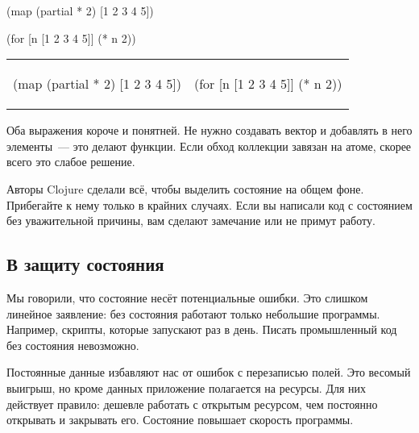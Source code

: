 \begin{clojure}
(map (partial * 2)
     [1 2 3 4 5])
\end{clojure}

\splitter

\begin{clojure}
(for [n [1 2 3 4 5]]
  (* n 2))
\end{clojure}

\else

\noindent
\begin{tabular}{ @{}p{5cm} @{}p{5cm} }

\begin{clojure}
(map (partial * 2)
     [1 2 3 4 5])
\end{clojure}

&

\begin{clojure}
(for [n [1 2 3 4 5]]
  (* n 2))
\end{clojure}

\end{tabular}

\fi

Оба выражения короче и понятней. Не нужно создавать вектор и добавлять в него
элементы~--- это делают функции. Если обход коллекции завязан на
атоме, скорее всего это слабое решение.

Авторы Clojure сделали всё, чтобы выделить состояние на общем фоне. Прибегайте к
нему только в крайних случаях. Если вы написали код с состоянием без
уважительной причины, вам сделают замечание или не примут работу.


\subsection{В защиту состояния}

Мы говорили, что состояние несёт потенциальные ошибки. Это слишком линейное
заявление: без состояния работают только небольшие программы. Например, скрипты,
которые запускают раз в день. Писать промышленный код без состояния невозможно.


Постоянные данные избавляют нас от ошибок с перезаписью полей. Это весомый
выигрыш, но кроме данных приложение полагается на ресурсы. Для них действует
правило: дешевле работать с открытым ресурсом, чем постоянно открывать и
закрывать его. Состояние повышает скорость программы.


